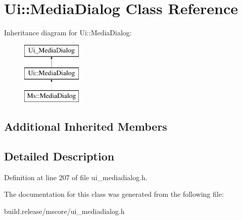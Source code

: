 \hypertarget{class_ui_1_1_media_dialog}{}\section{Ui\+:\+:Media\+Dialog Class Reference}
\label{class_ui_1_1_media_dialog}
Inheritance diagram for Ui\+:\+:Media\+Dialog\+:\begin{figure}[H]
\begin{center}
\leavevmode
\includegraphics[height=3.000000cm]{class_ui_1_1_media_dialog}
\end{center}
\end{figure}
\subsection*{Additional Inherited Members}


\subsection{Detailed Description}


Definition at line 207 of file ui\+\_\+mediadialog.\+h.



The documentation for this class was generated from the following file\+:\begin{DoxyCompactItemize}
\item 
build.\+release/mscore/ui\+\_\+mediadialog.\+h\end{DoxyCompactItemize}
